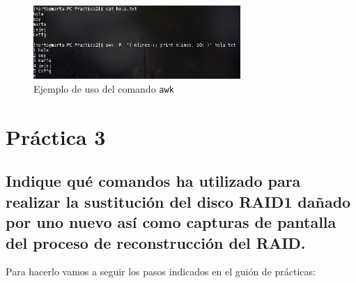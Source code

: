 \documentclass[10pt,a4paper,spanish]{article}
\numberwithin{equation}{section} %
\numberwithin{figure}{section} %
\numberwithin{table}{section} %
\begin{document}
\begin{figure}[!h]
    \centering
    \includegraphics[width=0.7\textwidth]{2_49}
    \caption{Ejemplo de uso del comando \texttt{awk}}
    \label{awkej}
\end{figure}

\section{Práctica 3}
\subsection{Indique qué comandos ha utilizado para realizar la sustitución del disco RAID1 dañado por uno nuevo así como capturas de pantalla del proceso de reconstrucción del RAID.}
Para hacerlo vamos a seguir los pasos indicados en el guión de prácticas:
\end{document}
